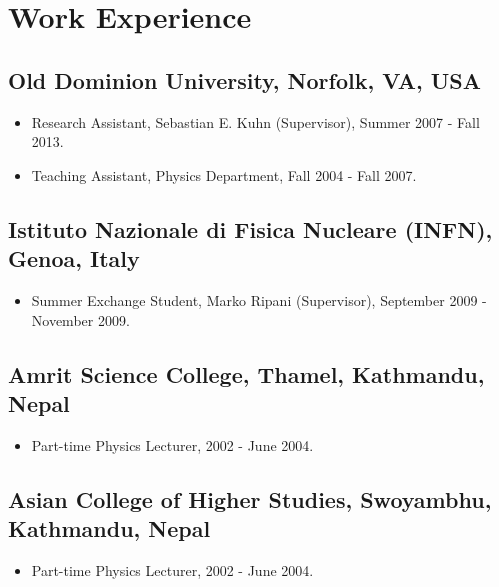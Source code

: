 \documentclass[10pt, letterpaper]{article}
\begin{document}
\section*{Work Experience}
\noindent

\subsection*{Old Dominion University, Norfolk, VA, USA}
\begin{itemize}
\item Research Assistant, Sebastian E. Kuhn (Supervisor), Summer 2007 - Fall 2013.
\item Teaching Assistant, Physics Department, Fall 2004 - Fall 2007.
\end{itemize}

\subsection*{Istituto Nazionale di Fisica Nucleare (INFN), Genoa, Italy}
\begin{itemize}
\item Summer Exchange Student, Marko Ripani (Supervisor), September 2009 - November 2009.
\end{itemize}

\subsection*{Amrit Science College, Thamel, Kathmandu, Nepal}
\begin{itemize}
\item Part-time Physics Lecturer, 2002 - June 2004.
\end{itemize}

\subsection*{Asian College of Higher Studies, Swoyambhu, Kathmandu, Nepal}
\begin{itemize}
\item Part-time Physics Lecturer, 2002 - June 2004.
\end{itemize}
\end{document}
